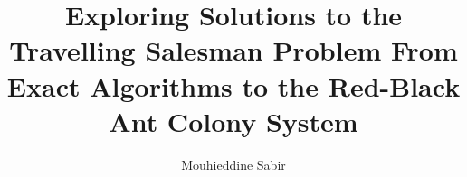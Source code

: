 \title{Exploring Solutions to the Travelling Salesman Problem From Exact Algorithms to the Red-Black Ant Colony System}
\author{Mouhieddine Sabir}


\coadvisorOneUniversity{}

